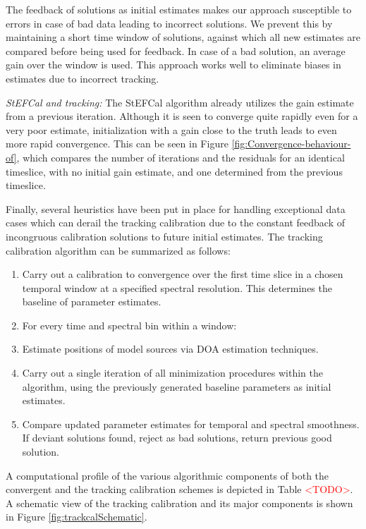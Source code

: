 \documentclass{aa}
\begin{document}
The feedback of solutions as initial estimates makes our approach susceptible to
errors in case  of bad data leading to incorrect solutions.   We prevent this by
maintaining a  short time window of  solutions, against which  all new estimates
are compared  before being  used for feedback.   In case  of a bad  solution, an
average gain  over the window  is used.  This  approach works well  to eliminate
biases in estimates due to incorrect tracking.

\emph{StEFCal  and tracking: }The  StEFCal algorithm  already utilizes  the gain
estimate  from a  previous  iteration. Although  it  is seen  to converge  quite
rapidly even for  a very poor estimate, initialization with a  gain close to the
truth  leads  to even  more  rapid  convergence.  This  can  be  seen in  Figure
\ref{fig:Convergence-behaviour-of}, which compares  the number of iterations and
the residuals for an identical timeslice, with no initial gain estimate, and one
determined from the previous timeslice.

Finally, several heuristics have been put in place for handling exceptional data
cases which can derail the tracking  calibration due to the constant feedback of
incongruous  calibration solutions  to future  initial estimates.   The tracking
calibration algorithm can be summarized as follows:
\begin{enumerate}
\item Carry  out a  calibration to convergence  over the  first time slice  in a
  chosen temporal window at a specified spectral resolution. This determines the
  baseline of parameter estimates.
\item For every time and spectral bin within a window:
\item Estimate positions of model sources via DOA estimation techniques.
\item Carry  out a  single iteration of  all minimization procedures  within the
  algorithm,  using  the previously  generated  baseline  parameters as  initial
  estimates.
\item Compare updated parameter  estimates for temporal and spectral smoothness.
  If  deviant solutions  found, reject  as bad  solutions, return  previous good
  solution.
\end{enumerate}
A  computational profile  of  the  various algorithmic  components  of both  the
convergent  and   the  tracking  calibration   schemes  is  depicted   in  Table
\textcolor{red}{<TODO>}. A  schematic view of  the tracking calibration  and its
major          components          is          shown          in          Figure
\textcolor{black}{\ref{fig:trackcalSchematic}.}
\end{document}
